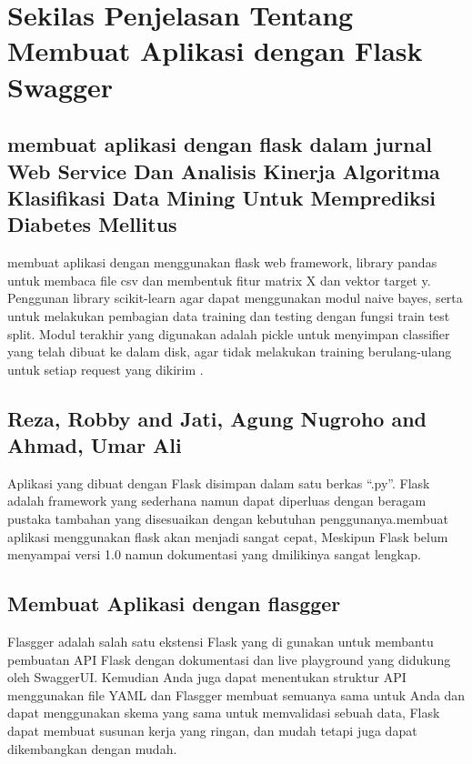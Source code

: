\documentclass[12pt]{article}
\begin{document}
\section{Sekilas Penjelasan Tentang Membuat Aplikasi dengan Flask Swagger}

\subsection{membuat aplikasi dengan flask dalam jurnal Web Service Dan  Analisis Kinerja Algoritma Klasifikasi Data Mining Untuk Memprediksi Diabetes Mellitus}
membuat aplikasi dengan menggunakan flask web framework, library pandas untuk membaca file csv dan membentuk fitur matrix X dan vektor target y. Penggunan library scikit-learn agar dapat menggunakan modul naive bayes, serta untuk melakukan pembagian data training dan testing dengan fungsi train test split. Modul terakhir yang digunakan adalah pickle untuk menyimpan classifier yang telah dibuat ke dalam disk, agar tidak melakukan training berulang-ulang untuk setiap request yang dikirim \cite{setyawan2017implementasi}. 

\subsection{Reza, Robby and Jati, Agung Nugroho and Ahmad, Umar Ali}
Aplikasi yang dibuat dengan Flask disimpan dalam satu berkas “.py”. Flask adalah framework yang sederhana namun dapat diperluas dengan beragam pustaka tambahan yang disesuaikan dengan kebutuhan penggunanya.membuat aplikasi menggunakan flask akan menjadi sangat cepat, Meskipun Flask belum menyampai versi 1.0 namun dokumentasi yang dmilikinya sangat lengkap\cite{reza2016perancangan}. 

\subsection{Membuat Aplikasi dengan flasgger}
Flasgger adalah salah satu ekstensi Flask yang di gunakan untuk membantu pembuatan API Flask dengan dokumentasi dan live playground yang didukung oleh SwaggerUI. Kemudian Anda juga dapat menentukan struktur API menggunakan file YAML dan Flasgger membuat semuanya sama untuk Anda dan dapat menggunakan skema yang sama untuk memvalidasi sebuah data, Flask dapat membuat susunan kerja yang ringan, dan mudah tetapi juga dapat dikembangkan dengan mudah\cite{gunawan2018aplikasi}.
\end{document}
